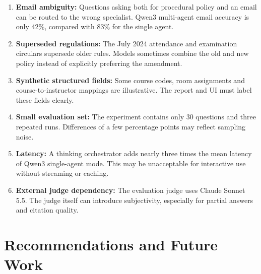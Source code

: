 \documentclass[11pt,a4paper]{article}
\begin{document}
\begin{enumerate}[leftmargin=*]
  \item \textbf{Email ambiguity:} Questions asking both for procedural policy and an email can be routed to the wrong specialist. Qwen3 multi-agent email accuracy is only 42\%, compared with 83\% for the single agent.
  \item \textbf{Superseded regulations:} The July 2024 attendance and examination circulars supersede older rules. Models sometimes combine the old and new policy instead of explicitly preferring the amendment.
  \item \textbf{Synthetic structured fields:} Some course codes, room assignments and course-to-instructor mappings are illustrative. The report and UI must label these fields clearly.
  \item \textbf{Small evaluation set:} The experiment contains only 30 questions and three repeated runs. Differences of a few percentage points may reflect sampling noise.
  \item \textbf{Latency:} A thinking orchestrator adds nearly three times the mean latency of Qwen3 single-agent mode. This may be unacceptable for interactive use without streaming or caching.
  \item \textbf{External judge dependency:} The evaluation judge uses Claude Sonnet 5.5. The judge itself can introduce subjectivity, especially for partial answers and citation quality.
\end{enumerate}

\section{Recommendations and Future Work}
\label{sec:future}
\end{document}
